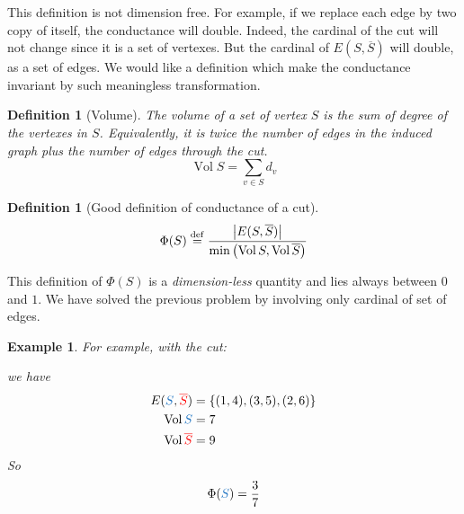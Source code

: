 \documentclass[12pt]{article}
\newtheorem{definition}[lemma]{Definition}
\newtheorem{example}[lemma]{Example}
\newcommand{\defeq}{\stackrel{{\rm def}}{=}}
\newcommand{\set}[1]{\left\{ #1 \right\}}
\newcommand{\card}[1]{\left\lvert#1\right\rvert}
\DeclareMathOperator{\vol}{Vol}
\begin{document}
This definition is not dimension free. For example, if we replace each edge by two copy of itself, the conductance will double. Indeed, the cardinal of the cut will not change since it is a set of vertexes. But the cardinal of $E(S,\overline{S})$ will double, as a set of edges. We would like a definition which make the conductance invariant by such meaningless transformation.

\begin{definition}[Volume]
    The volume of a set of vertex $S$ is the sum of degree of the vertexes in $S$. Equivalently, it is twice the number of edges in the induced graph plus the number of edges through the cut.
    \[
        \vol S = \sum\limits_{v\in S}d_v
    \]
\end{definition}

   
\begin{definition}[\textcolor{green!50!black}{Good definition of conductance of a cut}]
    \textcolor{green!50!black}{
    \[
        \Phi(S) \defeq \frac{\card{E(S,\overline{S})}}{\min\left(\vol S,\vol \overline{S}\right)}
    \]}
\end{definition}

This definition of $\Phi(S)$ is a \emph{dimension-less} quantity and lies always between $0$ and $1$. We have solved the previous problem by involving only cardinal of set of edges.

\begin{example}
    For example, with the cut:
    \begin{figure}[!ht]
        \centering
    \end{figure}
    \FloatBarrier
    \noindent    
    we have
    \[
        \begin{aligned}
            E(\textcolor{cyan!50!blue}{S},\textcolor{red}{\overline{S}}) &= \set{(1,4),(3,5), (2,6)}\\
            \vol \textcolor{cyan!50!blue}{S} &= 7\\
            \vol \textcolor{red}{\overline{S}} &= 9
        \end{aligned}
    \]
    So
    \[
        \Phi(\textcolor{cyan!50!blue}{S}) = \frac{3}{7}
    \]
\end{example}
\end{document}

